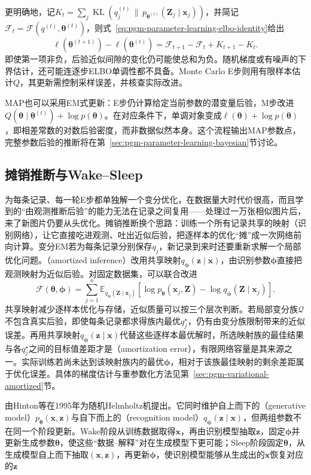更明确地，记$K_t=\sum_j\operatorname{KL}(q_j^{(t)}\,\|\,p_{\bm{\theta}^{(t)}}(\bm{Z}_j\mid\bm{x}_j))$，并简记$\mathcal{F}_t=\mathcal{F}(q^{(t)},\bm{\theta}^{(t)})$，则式~\eqref{eq:pgm-parameter-learning-elbo-identity}给出
\[
  \ell(\bm{\theta}^{(t+1)})-\ell(\bm{\theta}^{(t)})
  =\mathcal{F}_{t+1}-\mathcal{F}_t+K_{t+1}-K_t.
\]
即使第一项非负，后验近似间隙的变化仍可能使总和为负。随机梯度或有噪声的下界估计，还可能连逐步ELBO单调性都不具备。Monte Carlo E步则用有限样本估计$Q$，其更新需控制采样误差，并核查实际改进。

MAP也可以采用EM式更新：E步仍计算给定当前参数的潜变量后验，M步改进$Q(\bm{\theta}\mid\bm{\theta}^{(t)})+\log p(\bm{\theta})$。在对应条件下，单调对象变成$\ell(\bm{\theta})+\log p(\bm{\theta})$，即相差常数的对数后验密度，而非数据似然本身。这个流程输出MAP参数点，完整参数后验的推断将在第~\ref{sec:pgm-parameter-learning-bayesian}节讨论。

\subsection{摊销推断与Wake--Sleep}
\label{sec:pgm-parameter-learning-amortized}

为每条记录、每一轮E步都单独解一个变分优化，在数据量大时代价很高，而且学到的“由观测推断后验”的能力无法在记录之间复用——处理过一万张相似图片后，来了新图片仍要从头优化。摊销推断换个思路：训练一个所有记录共享的映射（识别网络），让它直接吃进观测、吐出近似后验，把逐样本的优化“摊”成一次网络前向计算。变分EM若为每条记录分别保存$q_j$，新记录到来时还要重新求解一个局部优化问题。（amortized inference）改用共享映射$q_{\bm{\phi}}(\bm{z}\mid\bm{x})$，由识别参数$\bm{\phi}$直接把观测映射为近似后验。对固定数据集，可以联合改进
\[
  \mathcal{F}(\bm{\theta},\bm{\phi})
  =\sum_{j=1}^n\mathbb{E}_{q_{\bm{\phi}}(\bm{Z}\mid\bm{x}_j)}
    [\log p_{\bm{\theta}}(\bm{x}_j,\bm{Z})
     -\log q_{\bm{\phi}}(\bm{Z}\mid\bm{x}_j)].
\]
共享映射减少逐样本优化与存储，近似质量可以按三个层次判断。若局部变分族$\mathcal{Q}$不包含真实后验，即使每条记录都求得族内最优$q_j^\star$，仍有由变分族限制带来的近似误差。再用共享映射$q_{\bm{\phi}}(\bm{z}\mid\bm{x})$代替这些逐样本最优解时，所选映射族的最佳结果与各$q_j^\star$之间的目标值差距才是（amortization error），有限网络容量是其来源之一。实际训练若尚未达到该映射族内的最优$\bm{\phi}$，相对于该族最佳映射的剩余差距属于优化误差。具体的梯度估计与重参数化方法见第~\ref{sec:pgm-variational-amortized}节。

由Hinton等在1995年为随机Helmholtz机提出。它同时维护自上而下的（generative model）$p_{\bm{\theta}}(\bm{x},\bm{z})$与自下而上的（recognition model）$q_{\bm{\phi}}(\bm{z}\mid\bm{x})$，但两组参数不在同一个阶段更新。Wake阶段从训练数据取得$\bm{x}$，再由识别模型抽取$\bm{z}$，固定$\bm{\phi}$并更新生成参数$\bm{\theta}$，使这些“数据--解释”对在生成模型下更可能；Sleep阶段固定$\bm{\theta}$，从生成模型自上而下抽取$(\bm{x},\bm{z})$，再更新$\bm{\phi}$，使识别模型能够从生成出的$\bm{x}$恢复对应的$\bm{z}$

